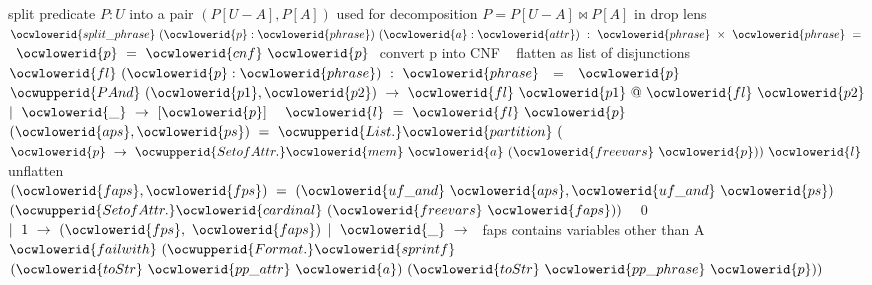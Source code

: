 \documentclass[12pt]{article}
\begin{document}
\ocwendcode{}\ocwindent{0.00em}
split predicate $P:U$ into a pair $(P[U-A],P[A])$ 
\ocweol
\ocwindent{0.00em}
used for decomposition $P= P[U-A] \bowtie P[A]$ in drop lens  
\ocweol
\label{rellens.ml:41674}%
\medskip
\ocwbegincode{}\ocwindent{0.00em}
~$\ocwlowerid{split\_phrase}~(\ocwlowerid{p}:\ocwlowerid{phrase})~(\ocwlowerid{a}:\ocwlowerid{attr})~:~\ocwlowerid{phrase}~\times{}~\ocwlowerid{phrase}~=~$\ocweol
\ocwindent{0.50em}
~$\ocwlowerid{p}~=~\ocwlowerid{cnf}~\ocwlowerid{p}~$\ocwbc{} convert p into CNF \ocwec{}~\ocweol
\ocwindent{0.50em}
\ocwbc{} flatten as list of disjunctions \ocwec{}\ocweol
\ocwindent{0.50em}
~~$\ocwlowerid{fl}~(\ocwlowerid{p}:\ocwlowerid{phrase})~:~\ocwlowerid{phrase}~$~=~~$\ocwlowerid{p}~$\ocweol
\ocwindent{1.50em}
$\ocwupperid{PAnd}~(\ocwlowerid{p1},\ocwlowerid{p2})~\rightarrow{}~\ocwlowerid{fl}~\ocwlowerid{p1}~@~\ocwlowerid{fl}~\ocwlowerid{p2}$\ocweol
\ocwindent{0.50em}
$\mid{}~\ocwlowerid{\_}~\rightarrow{}~[\ocwlowerid{p}]~$\ocweol
\ocwindent{0.50em}
~$\ocwlowerid{l}~=~\ocwlowerid{fl}~\ocwlowerid{p}~$\ocweol
\ocwindent{0.50em}
~$(\ocwlowerid{aps},\ocwlowerid{ps})~=~\ocwupperid{List.}\ocwlowerid{partition}~($~$\ocwlowerid{p}~\rightarrow{}~\ocwupperid{SetofAttr.}\ocwlowerid{mem}~\ocwlowerid{a}~(\ocwlowerid{freevars}~\ocwlowerid{p}))~\ocwlowerid{l}~$\ocweol
\ocwindent{1.00em}
\ocwbc{} unflatten \ocwec{}\ocweol
\ocwindent{0.50em}
~$(\ocwlowerid{faps},\ocwlowerid{fps})~=~(\ocwlowerid{uf\_and}~\ocwlowerid{aps},\ocwlowerid{uf\_and}~\ocwlowerid{ps})~$\ocweol
\ocwindent{0.50em}
~$(\ocwupperid{SetofAttr.}\ocwlowerid{cardinal}~(\ocwlowerid{freevars}~\ocwlowerid{faps}))~$~\ocweol
\ocwindent{1.50em}
0~$\mid{}~1~\rightarrow{}~(\ocwlowerid{fps},~\ocwlowerid{faps})$\ocweol
\ocwindent{0.50em}
$\mid{}~\ocwlowerid{\_}~\rightarrow{}~$\ocwbc{} faps contains variables other than A \ocwec{}\ocweol
\ocwindent{2.50em}
$\ocwlowerid{failwith}~(\ocwupperid{Format.}\ocwlowerid{sprintf}~$\ocweol
\ocwindent{3.50em}
\ocweol
\ocwindent{8.50em}
$(\ocwlowerid{toStr}~\ocwlowerid{pp\_attr}~\ocwlowerid{a})~(\ocwlowerid{toStr}~\ocwlowerid{pp\_phrase}~\ocwlowerid{p}))$\medskip
\end{document}
